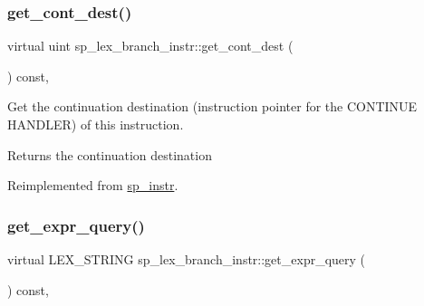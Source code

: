 \mbox{\label{classsp__lex__branch__instr_a5e6dfdf34d9f45fb3f2d2386029b95c6}} 
\subsubsection{\texorpdfstring{get\+\_\+cont\+\_\+dest()}{get\_cont\_dest()}}
{\footnotesize\ttfamily virtual uint sp\+\_\+lex\+\_\+branch\+\_\+instr\+::get\+\_\+cont\+\_\+dest (\begin{DoxyParamCaption}{ }\end{DoxyParamCaption}) const\hspace{0.3cm}{\ttfamily [inline]}, {\ttfamily [virtual]}}

Get the continuation destination (instruction pointer for the C\+O\+N\+T\+I\+N\+UE H\+A\+N\+D\+L\+ER) of this instruction. \begin{DoxyReturn}{Returns}
the continuation destination 
\end{DoxyReturn}


Reimplemented from \mbox{\hyperlink{classsp__instr_a3430a1d05e78933479736c452d555b1e}{sp\+\_\+instr}}.

\mbox{\label{classsp__lex__branch__instr_a3693c3f9cc8fdf15092dcb3d4183075b}} 
\subsubsection{\texorpdfstring{get\+\_\+expr\+\_\+query()}{get\_expr\_query()}}
{\footnotesize\ttfamily virtual L\+E\+X\+\_\+\+S\+T\+R\+I\+NG sp\+\_\+lex\+\_\+branch\+\_\+instr\+::get\+\_\+expr\+\_\+query (\begin{DoxyParamCaption}{ }\end{DoxyParamCaption}) const\hspace{0.3cm}{\ttfamily [inline]}, {\ttfamily [virtual]}}

